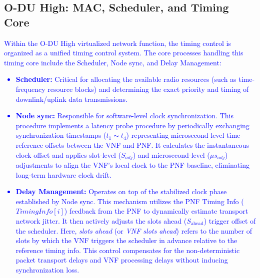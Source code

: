 \documentclass[10pt, conference, letterpaper]{IEEEtran}
\begin{document}
\subsection{O-DU High: MAC, Scheduler, and Timing Core}
\label{subsec:B_odu_high}
\textcolor{blue}{Within the O-DU High virtualized network function, the timing control is organized as a unified timing control system. The core processes handling this timing core include the Scheduler, Node sync, and Delay Management:
\begin{itemize}
\item \textbf{Scheduler:} Critical for allocating the available radio resources (such as time-frequency resource blocks) and determining the exact priority and timing of downlink/uplink data transmissions.
\item \textbf{Node sync:} Responsible for software-level clock synchronization. This procedure implements a latency probe procedure by periodically exchanging synchronization timestamps ($t_1 \sim t_4$) representing microsecond-level time-reference offsets between the VNF and PNF. It calculates the instantaneous clock offset and applies slot-level ($S_{adj}$) and microsecond-level ($\mu s_{adj}$) adjustments to align the VNF's local clock to the PNF baseline, eliminating long-term hardware clock drift.
\item \textbf{Delay Management:} Operates on top of the stabilized clock phase established by Node sync. This mechanism utilizes the PNF Timing Info ($\mathit{TimingInfo}[i]$) feedback from the PNF to dynamically estimate transport network jitter. It then actively adjusts the slots ahead ($S_{\mathrm{ahead}}$) trigger offset of the scheduler. Here, \textit{slots ahead} (or \textit{VNF slots ahead}) refers to the number of slots by which the VNF triggers the scheduler in advance relative to the reference timing info. This control compensates for the non-deterministic packet transport delays and VNF processing delays without inducing synchronization loss.
\end{itemize}}
\end{document}

